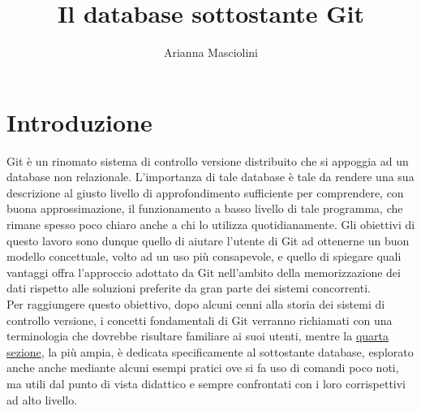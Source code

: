 \documentclass[12pt]{article}
\title{Il database sottostante Git}
\author{Arianna Masciolini}
\begin{document}
\maketitle
\newpage
\tableofcontents
\newpage
\section{Introduzione}
Git è un rinomato sistema di controllo versione distribuito che si appoggia ad un database non relazionale. L'importanza di tale database è tale da rendere una sua descrizione al giusto livello di approfondimento sufficiente per comprendere, con buona approssimazione, il funzionamento a basso livello di tale programma, che rimane spesso poco chiaro anche a chi lo utilizza quotidianamente. 
Gli obiettivi di questo lavoro sono dunque quello di aiutare l'utente di Git ad ottenerne un buon modello concettuale, volto ad un uso più consapevole, e quello di spiegare quali vantaggi offra l'approccio adottato da Git nell'ambito della memorizzazione dei dati rispetto alle soluzioni preferite da gran parte dei sistemi concorrenti. 
\bigskip \\
Per raggiungere questo obiettivo, dopo alcuni cenni alla storia dei sistemi di controllo versione, i concetti fondamentali di Git verranno richiamati con una terminologia che dovrebbe risultare familiare ai suoi utenti, mentre la \hyperref[quarta sezione]{quarta sezione}, la più ampia, è dedicata specificamente al sottostante database, esplorato anche anche mediante alcuni esempi pratici ove si fa uso di comandi poco noti, ma utili dal punto di vista didattico e sempre confrontati con i loro corrispettivi ad alto livello.
\end{document}
